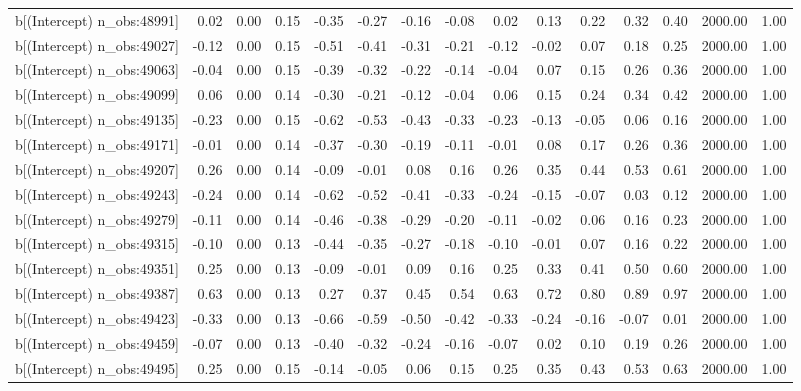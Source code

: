 \begin{table}[ht]
\begin{tabular}{rrrrrrrrrrrrrrr}
  b[(Intercept) n\_obs:48991] & 0.02 & 0.00 & 0.15 & -0.35 & -0.27 & -0.16 & -0.08 & 0.02 & 0.13 & 0.22 & 0.32 & 0.40 & 2000.00 & 1.00 \\ 
  b[(Intercept) n\_obs:49027] & -0.12 & 0.00 & 0.15 & -0.51 & -0.41 & -0.31 & -0.21 & -0.12 & -0.02 & 0.07 & 0.18 & 0.25 & 2000.00 & 1.00 \\ 
  b[(Intercept) n\_obs:49063] & -0.04 & 0.00 & 0.15 & -0.39 & -0.32 & -0.22 & -0.14 & -0.04 & 0.07 & 0.15 & 0.26 & 0.36 & 2000.00 & 1.00 \\ 
  b[(Intercept) n\_obs:49099] & 0.06 & 0.00 & 0.14 & -0.30 & -0.21 & -0.12 & -0.04 & 0.06 & 0.15 & 0.24 & 0.34 & 0.42 & 2000.00 & 1.00 \\ 
  b[(Intercept) n\_obs:49135] & -0.23 & 0.00 & 0.15 & -0.62 & -0.53 & -0.43 & -0.33 & -0.23 & -0.13 & -0.05 & 0.06 & 0.16 & 2000.00 & 1.00 \\ 
  b[(Intercept) n\_obs:49171] & -0.01 & 0.00 & 0.14 & -0.37 & -0.30 & -0.19 & -0.11 & -0.01 & 0.08 & 0.17 & 0.26 & 0.36 & 2000.00 & 1.00 \\ 
  b[(Intercept) n\_obs:49207] & 0.26 & 0.00 & 0.14 & -0.09 & -0.01 & 0.08 & 0.16 & 0.26 & 0.35 & 0.44 & 0.53 & 0.61 & 2000.00 & 1.00 \\ 
  b[(Intercept) n\_obs:49243] & -0.24 & 0.00 & 0.14 & -0.62 & -0.52 & -0.41 & -0.33 & -0.24 & -0.15 & -0.07 & 0.03 & 0.12 & 2000.00 & 1.00 \\ 
  b[(Intercept) n\_obs:49279] & -0.11 & 0.00 & 0.14 & -0.46 & -0.38 & -0.29 & -0.20 & -0.11 & -0.02 & 0.06 & 0.16 & 0.23 & 2000.00 & 1.00 \\ 
  b[(Intercept) n\_obs:49315] & -0.10 & 0.00 & 0.13 & -0.44 & -0.35 & -0.27 & -0.18 & -0.10 & -0.01 & 0.07 & 0.16 & 0.22 & 2000.00 & 1.00 \\ 
  b[(Intercept) n\_obs:49351] & 0.25 & 0.00 & 0.13 & -0.09 & -0.01 & 0.09 & 0.16 & 0.25 & 0.33 & 0.41 & 0.50 & 0.60 & 2000.00 & 1.00 \\ 
  b[(Intercept) n\_obs:49387] & 0.63 & 0.00 & 0.13 & 0.27 & 0.37 & 0.45 & 0.54 & 0.63 & 0.72 & 0.80 & 0.89 & 0.97 & 2000.00 & 1.00 \\ 
  b[(Intercept) n\_obs:49423] & -0.33 & 0.00 & 0.13 & -0.66 & -0.59 & -0.50 & -0.42 & -0.33 & -0.24 & -0.16 & -0.07 & 0.01 & 2000.00 & 1.00 \\ 
  b[(Intercept) n\_obs:49459] & -0.07 & 0.00 & 0.13 & -0.40 & -0.32 & -0.24 & -0.16 & -0.07 & 0.02 & 0.10 & 0.19 & 0.26 & 2000.00 & 1.00 \\ 
  b[(Intercept) n\_obs:49495] & 0.25 & 0.00 & 0.15 & -0.14 & -0.05 & 0.06 & 0.15 & 0.25 & 0.35 & 0.43 & 0.53 & 0.63 & 2000.00 & 1.00 \\ 

\end{tabular}
\end{table}
